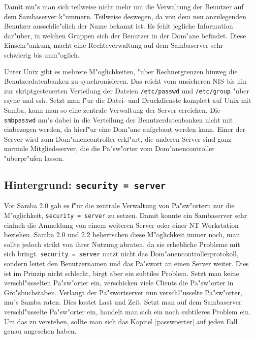 \documentclass{scrartcl}\usepackage{pslatex}\typearea{12}
\newcommand{\param}{\texttt}
\newcommand{\dateistyle}{\texttt}
\begin{document}
Damit mu"s man sich teilweise nicht mehr um die Verwaltung der
Benutzer auf dem Sambaserver k"ummern. Teilweise deswegen, da von dem
neu anzulegenden Benutzer ausschlie"slich der Name bekannt ist. Es
fehlt jegliche Information dar"uber, in welchen Gruppen sich der
Benutzer in der Dom"ane befindet. Diese Einschr"ankung macht eine
Rechteverwaltung auf dem Sambaserver sehr schwierig bis unm"oglich.

Unter Unix gibt es mehrere M"oglichkeiten, "uber Rechnergrenzen hinweg die
Benutzerdatenbanken zu synchronisieren. Das reicht vom unsicheren NIS bis hin
zur skriptgesteuerten Verteilung der Dateien \dateistyle{/etc/passwd} und
\dateistyle{/etc/group} "uber rsync und ssh. Setzt man f"ur die Datei- und
Druckdienste komplett auf Unix mit Samba, kann man so eine zentrale
Verwaltung der Server erreichen. Die \dateistyle{smbpasswd} mu"s dabei in die
Verteilung der Benutzerdatenbanken nicht mit einbezogen werden, da hierf"ur
eine Dom"ane aufgebaut werden kann. Einer der Server wird zum
Dom"anencontroller erkl"art, die anderen Server sind ganz normale
Mitgliedsserver, die die Pa"sw"orter vom Dom"anencontroller "uberpr"ufen lassen.

\subsection{Hintergrund: \param{security = server}}

Vor Samba 2.0 gab es f"ur die zentrale Verwaltung von Pa"sw"ortern nur
die M"oglichkeit, \param{security = server} zu setzen. Damit konnte
ein Sambaserver sehr einfach die Anmeldung von einem weiteren Server
oder einer NT Workstation beziehen. Samba 2.0 und 2.2 beherrschen
diese M"oglichkeit immer noch, man sollte jedoch strikt von ihrer
Nutzung abraten, da sie erhebliche Probleme mit sich bringt.
\param{security = server} nutzt nicht das Dom"anencontrollerprotokoll,
sondern leitet den Benutzernamen und das Pa"swort an einen Server
weiter. Dies ist im Prinzip nicht schlecht, birgt aber ein subtiles
Problem. Setzt man keine verschl"usselten Pa"sw"orter ein, verschicken
viele Clients die Pa"sw"orter in Gro"sbuchstaben. Verlangt der
Pa"swortserver nun verschl"usselte Pa"sw"orter, mu"s Samba raten. Dies
kostet Last und Zeit. Setzt man auf dem Sambaserver verschl"usselte
Pa"sw"orter ein, handelt man sich ein noch subtileres Problem ein. Um
das zu verstehen, sollte man sich das Kapitel \ref{passwoerter} auf
jeden Fall genau angesehen haben.
\end{document}
